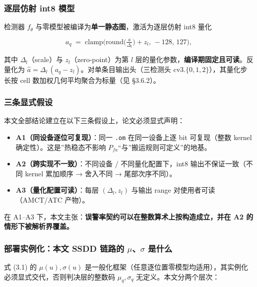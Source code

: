 \subsubsection{逐层仿射 int8
模型}\label{ux9010ux5c42ux4effux5c04-int8-ux6a21ux578b}

检测器 \(f_\theta\) 与零模型被编译为\textbf{单一静态图}，激活为逐层仿射
int8 量化

\[
a_q \;=\; \mathrm{clamp}\!\Big(\mathrm{round}\!\big(\tfrac{a}{\Delta_l}\big)+z_l,\,-128,\,127\Big),
\tag{3.9}
\]

其中 \(\Delta_l\)（scale）与 \(z_l\)（zero-point）为第 \(l\)
层的量化参数，\textbf{编译期固定且可读}。反量化为
\(\hat{a}=\Delta_l\,(a_q-z_l)\)。对单条目输出头（三检测头
\(\mathrm{cv3}.\{0,1,2\}\)），其量化步长按 cell
数加权几何平均聚合为标量（见 §3.6.2）。

\subsubsection{三条显式假设}\label{ux4e09ux6761ux663eux5f0fux5047ux8bbe}

本文全部结论建立在以下三条假设上，论文必须显式声明：

\begin{itemize}
\tightlist
\item
  \textbf{A1（同设备逐位可复现）}：同一 \texttt{.om} 在同一设备上逐 bit
  可复现（整数 kernel 确定性）。这是''热稳态不影响
  \(P_{fa}\)``与''搬运规则可定义''的地基。
\item
  \textbf{A2（跨实现不一致）}：不同设备 / 不同量化配置下，int8
  输出不保证一致（不同 kernel 累加顺序 → 舍入不同 → 尾部次序不同）。
\item
  \textbf{A3（量化配置可读）}：每层 \((\Delta_l,z_l)\) 与输出 range
  对使用者可读（AMCT/ATC 产物）。
\end{itemize}

在 A1--A3
下，本文主张：\textbf{误警率契约可以在整数算术上按构造成立，并在 A2
的情形下被解析界覆盖。}

\subsubsection{\texorpdfstring{部署实例化：本文 SSDD 链路的
\(\mu\)、\(\sigma\)
是什么}{部署实例化：本文 SSDD 链路的 \textbackslash mu、\textbackslash sigma 是什么}}\label{ux90e8ux7f72ux5b9eux4f8bux5316ux672cux6587-ssdd-ux94feux8defux7684-musigma-ux662fux4ec0ux4e48}

式 (3.1) 的 \(\mu(u),\sigma(u)\)
是一般化框架（任意逐位置零模型均适用），其实例化必须显式交代，否则判决层的整数码
\(\mu_q,\sigma_q\) 无定义。本文分两个层次：

